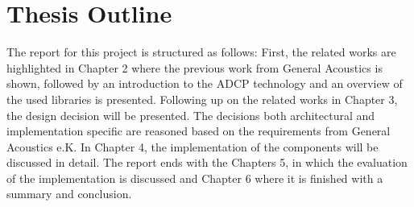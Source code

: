 \section{Thesis Outline}
The report for this project is structured as follows: First, the related works are highlighted in Chapter 2 where the previous work from General Acoustics is shown, followed by an introduction to the ADCP technology and an overview of the used libraries is presented. Following up on the related works in Chapter 3, the design decision will be presented. The decisions both architectural and implementation specific are reasoned based on the requirements from General Acoustics e.K. In Chapter 4, the implementation of the components will be discussed in detail. The report ends with the Chapters 5, in which the evaluation of the implementation is discussed and Chapter 6 where it is finished with a summary and conclusion.


